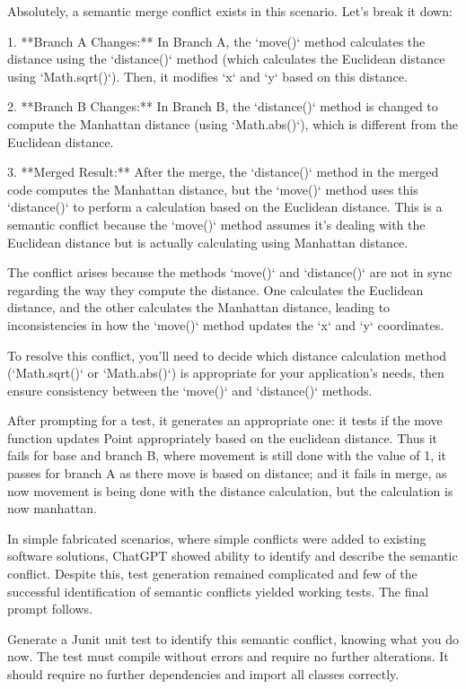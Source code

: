 \begin{response}
Absolutely, a semantic merge conflict exists in this scenario. Let's break it down:

1. **Branch A Changes:** In Branch A, the `move()` method calculates the distance using the `distance()` method (which calculates the Euclidean distance using `Math.sqrt()`). Then, it modifies `x` and `y` based on this distance.

2. **Branch B Changes:** In Branch B, the `distance()` method is changed to compute the Manhattan distance (using `Math.abs()`), which is different from the Euclidean distance.

3. **Merged Result:** After the merge, the `distance()` method in the merged code computes the Manhattan distance, but the `move()` method uses this `distance()` to perform a calculation based on the Euclidean distance. This is a semantic conflict because the `move()` method assumes it's dealing with the Euclidean distance but is actually calculating using Manhattan distance.

The conflict arises because the methods `move()` and `distance()` are not in sync regarding the way they compute the distance. One calculates the Euclidean distance, and the other calculates the Manhattan distance, leading to inconsistencies in how the `move()` method updates the `x` and `y` coordinates.

To resolve this conflict, you'll need to decide which distance calculation method (`Math.sqrt()` or `Math.abs()`) is appropriate for your application's needs, then ensure consistency between the `move()` and `distance()` methods.
\end{response}

After prompting for a test, it generates an appropriate one: it tests if the move function updates Point appropriately based on the euclidean distance. Thus it fails for base and branch B, where movement is still done with the value of 1, it passes for branch A as there move is based on distance; and it fails in merge, as now movement is being done with the distance calculation, but the calculation is now manhattan.

In simple fabricated scenarios, where simple conflicts were added to existing software solutions, ChatGPT showed ability to identify and describe the semantic conflict. Despite this, test generation remained complicated and few of the successful identification of semantic conflicts yielded working tests. The final prompt follows.

\begin{prompt}
Generate a Junit unit test to identify this semantic conflict, knowing what you do now. The test must compile without errors and require no further alterations. It should require no further dependencies and import all classes correctly.
\end{prompt}

